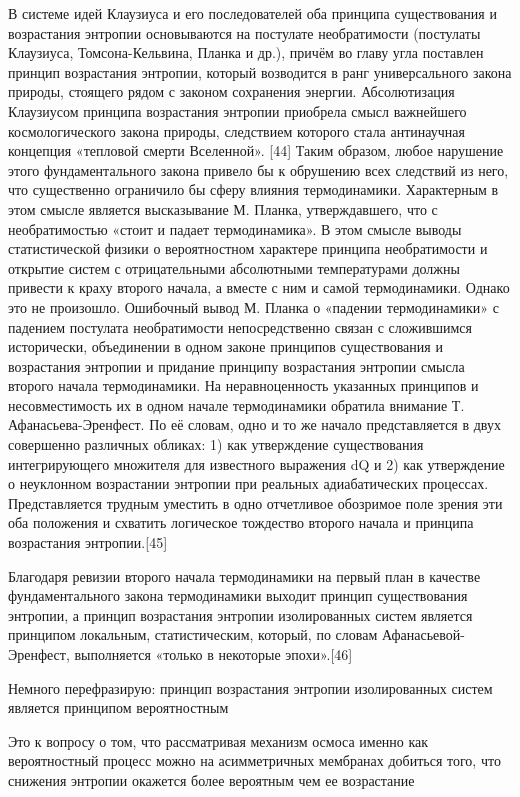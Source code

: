 \documentclass[11pt]{article}
\begin{document}
В системе идей Клаузиуса и его последователей оба принципа существования
и возрастания энтропии основываются на постулате необратимости
(постулаты Клаузиуса, Томсона-Кельвина, Планка и др.), причём во главу
угла поставлен принцип возрастания энтропии, который возводится в ранг
универсального закона природы, стоящего рядом с законом сохранения
энергии. Абсолютизация Клаузиусом принципа возрастания энтропии
приобрела смысл важнейшего космологического закона природы, следствием
которого стала антинаучная концепция «тепловой смерти Вселенной».
{[}44{]} Таким образом, любое нарушение этого фундаментального закона
привело бы к обрушению всех следствий из него, что существенно
ограничило бы сферу влияния термодинамики. Характерным в этом смысле
является высказывание М. Планка, утверждавшего, что с необратимостью
«стоит и падает термодинамика». В этом смысле выводы статистической
физики о вероятностном характере принципа необратимости и открытие
систем с отрицательными абсолютными температурами должны привести к
краху второго начала, а вместе с ним и самой термодинамики. Однако это
не произошло. Ошибочный вывод М. Планка о «падении термодинамики» с
падением постулата необратимости непосредственно связан с сложившимся
исторически, объединении в одном законе принципов существования и
возрастания энтропии и придание принципу возрастания энтропии смысла
второго начала термодинамики. На неравноценность указанных принципов и
несовместимость их в одном начале термодинамики обратила внимание Т.
Афанасьева-Эренфест. По её словам, одно и то же начало представляется в
двух совершенно различных обликах: 1) как утверждение существования
интегрирующего множителя для известного выражения dQ и 2) как
утверждение о неуклонном возрастании энтропии при реальных
адиабатических процессах. Представляется трудным уместить в одно
отчетливое обозримое поле зрения эти оба положения и схватить логическое
тождество второго начала и принципа возрастания энтропии.{[}45{]}

Благодаря ревизии второго начала термодинамики на первый план в качестве
фундаментального закона термодинамики выходит принцип существования
энтропии, а принцип возрастания энтропии изолированных систем является
принципом локальным, статистическим, который, по словам
Афанасьевой-Эренфест, выполняется «только в некоторые эпохи».{[}46{]}

Немного перефразирую: принцип возрастания энтропии изолированных систем
является принципом вероятностным

Это к вопросу о том, что рассматривая механизм осмоса именно как
вероятностный процесс можно на асимметричных мембранах добиться того,
что снижения энтропии окажется более вероятным чем ее возрастание




    
    
    
\end{document}
